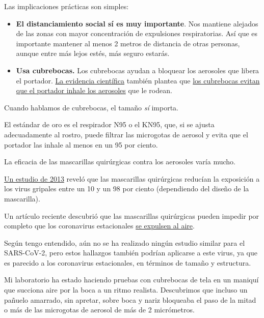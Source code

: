 Las implicaciones prácticas son simples:

\begin{itemize}
\item
  \textbf{El distanciamiento social sí es muy importante}. Nos mantiene
  alejados de las zonas con mayor concentración de expulsiones
  respiratorias. Así que es importante mantener al menos 2 metros de
  distancia de otras personas, aunque entre más lejos estés, más seguro
  estarás.
\item
  \textbf{Usa cubrebocas.} Los cubrebocas ayudan a bloquear los
  aerosoles que libera el portador.
  \href{https://ucsf.app.box.com/s/blvolkp5z0mydzd82rjks4wyleagt036}{La
  evidencia científica} también plantea que
  \href{https://www.nytimes3xbfgragh.onion/2020/07/27/health/coronavirus-mask-protection.html?campaign_id=154\&emc=edit_cb_20200727\&instance_id=20696\&nl=coronavirus-briefing\&regi_id=65413713\&segment_id=34503\&te=1\&user_id=bd32fbf008e5183a7928ed61c60669f7}{los
  cubrebocas evitan que el portador inhale los aerosoles} que le rodean.
\end{itemize}

Cuando hablamos de cubrebocas, el tamaño \emph{sí} importa.

El estándar de oro es el respirador N95 o el KN95, que, si se ajusta
adecuadamente al rostro, puede filtrar las microgotas de aerosol y evita
que el portador las inhale al menos en un 95 por ciento.

La eficacia de las mascarillas quirúrgicas contra los aerosoles varía
mucho.

\href{https://pubmed.ncbi.nlm.nih.gov/23498357/}{Un estudio de 2013}
reveló que las mascarillas quirúrgicas reducían la exposición a los
virus gripales entre un 10 y un 98 por ciento (dependiendo del diseño de
la mascarilla).

Un artículo reciente descubrió que las mascarillas quirúrgicas pueden
impedir por completo que los coronavirus estacionales
\href{https://www.nature.com/articles/s41591-020-0843-2}{se expulsen al
aire}.

Según tengo entendido, aún no se ha realizado ningún estudio similar
para el SARS-CoV-2, pero estos hallazgos también podrían aplicarse a
este virus, ya que es parecido a los coronavirus estacionales, en
términos de tamaño y estructura.

Mi laboratorio ha estado haciendo pruebas con cubrebocas de tela en un
maniquí que succiona aire por la boca a un ritmo realista. Descubrimos
que incluso un pañuelo amarrado, sin apretar, sobre boca y nariz
bloqueaba el paso de la mitad o más de las microgotas de aerosol de más
de 2 micrómetros.

